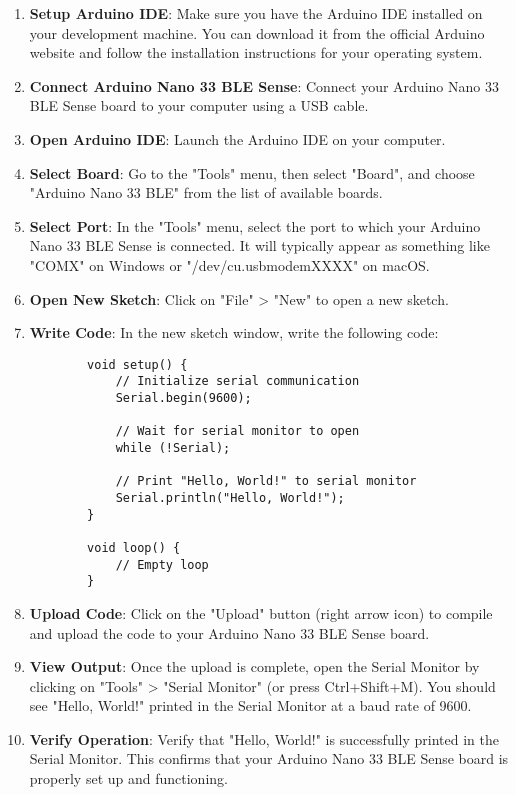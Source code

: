 \begin{enumerate}
    \item \textbf{Setup Arduino IDE}: Make sure you have the Arduino IDE installed on your development machine. You can download it from the official Arduino website and follow the installation instructions for your operating system.
    
    \item \textbf{Connect Arduino Nano 33 BLE Sense}: Connect your Arduino Nano 33 BLE Sense board to your computer using a USB cable.\cite{Fezari:2018}
    
    \item \textbf{Open Arduino IDE}: Launch the Arduino IDE on your computer.
    
    \item \textbf{Select Board}: Go to the "Tools" menu, then select "Board", and choose "Arduino Nano 33 BLE" from the list of available boards.
    
    \item \textbf{Select Port}: In the "Tools" menu, select the port to which your Arduino Nano 33 BLE Sense is connected. It will typically appear as something like "COMX" on Windows or "/dev/cu.usbmodemXXXX" on macOS.
    
    \item \textbf{Open New Sketch}: Click on "File" > "New" to open a new sketch.
    
    \item \textbf{Write Code}: In the new sketch window, write the following code:
    
    \begin{verbatim}
        void setup() {
            // Initialize serial communication
            Serial.begin(9600);
            
            // Wait for serial monitor to open
            while (!Serial);
            
            // Print "Hello, World!" to serial monitor
            Serial.println("Hello, World!");
        }
        
        void loop() {
            // Empty loop
        }
    \end{verbatim}
    
    \item \textbf{Upload Code}: Click on the "Upload" button (right arrow icon) to compile and upload the code to your Arduino Nano 33 BLE Sense board.
    
    \item \textbf{View Output}: Once the upload is complete, open the Serial Monitor by clicking on "Tools" > "Serial Monitor" (or press Ctrl+Shift+M). You should see "Hello, World!" printed in the Serial Monitor at a baud rate of 9600.
    
    \item \textbf{Verify Operation}: Verify that "Hello, World!" is successfully printed in the Serial Monitor. This confirms that your Arduino Nano 33 BLE Sense board is properly set up and functioning.
\end{enumerate}

